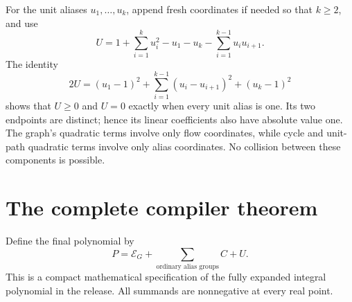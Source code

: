 \documentclass[11pt]{article}
\theoremstyle{definition}\newtheorem{definition}[theorem]{Definition}
\theoremstyle{remark}\newtheorem{remark}[theorem]{Remark}
\begin{document}
For the unit aliases $u_1,\ldots,u_k$, append fresh coordinates if needed so
that $k\ge2$, and use
\[
 U=1+\sum_{i=1}^k u_i^2-u_1-u_k-
                            \sum_{i=1}^{k-1}u_iu_{i+1}.
\]
The identity
\[
 2U=(u_1-1)^2+\sum_{i=1}^{k-1}(u_i-u_{i+1})^2+(u_k-1)^2
\]
shows that $U\ge0$ and $U=0$ exactly when every unit alias is one. Its two
endpoints are distinct; hence its linear coefficients also have absolute value
one. The graph's quadratic terms involve only flow coordinates, while cycle
and unit-path quadratic terms involve only alias coordinates. No collision
between these components is possible.

\section{The complete compiler theorem}
\label{sec:compiler}

Define the final polynomial by
\begin{equation}\label{eq:wholegraph}
  \boxed{\quad P=\mathcal E_G+\sum_{\text{ordinary alias groups}}C+U.\quad}
\end{equation}
This is a compact mathematical specification of the fully expanded integral
polynomial in the release. All summands are nonnegative at every real point.
\end{document}
